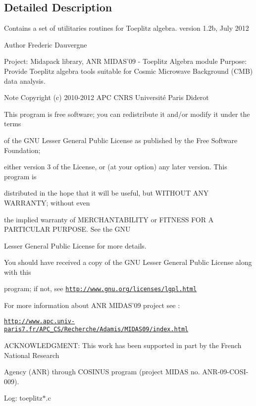 \subsection{Detailed Description}
Contains a set of utilitaries routines for Toeplitz algebra. version 1.\-2b, July 2012 \begin{DoxyAuthor}{Author}
Frederic Dauvergne
\end{DoxyAuthor}
Project\-: Midapack library, A\-N\-R M\-I\-D\-A\-S'09 -\/ Toeplitz Algebra module Purpose\-: Provide Toeplitz algebra tools suitable for Cosmic Microwave Background (C\-M\-B) data analysis.

\begin{DoxyNote}{Note}
Copyright (c) 2010-\/2012 A\-P\-C C\-N\-R\-S Université Paris Diderot 



This program is free software; you can redistribute it and/or modify it under the terms 

of the G\-N\-U Lesser General Public License as published by the Free Software Foundation; 

either version 3 of the License, or (at your option) any later version. This program is 

distributed in the hope that it will be useful, but W\-I\-T\-H\-O\-U\-T A\-N\-Y W\-A\-R\-R\-A\-N\-T\-Y; without even 

the implied warranty of M\-E\-R\-C\-H\-A\-N\-T\-A\-B\-I\-L\-I\-T\-Y or F\-I\-T\-N\-E\-S\-S F\-O\-R A P\-A\-R\-T\-I\-C\-U\-L\-A\-R P\-U\-R\-P\-O\-S\-E. See the G\-N\-U 

Lesser General Public License for more details. 



You should have received a copy of the G\-N\-U Lesser General Public License along with this 

program; if not, see \href{http://www.gnu.org/licenses/lgpl.html}{\tt http\-://www.\-gnu.\-org/licenses/lgpl.\-html} 

For more information about A\-N\-R M\-I\-D\-A\-S'09 project see \-: 

\href{http://www.apc.univ-paris7.fr/APC_CS/Recherche/Adamis/MIDAS09/index.html}{\tt http\-://www.\-apc.\-univ-\/paris7.\-fr/\-A\-P\-C\-\_\-\-C\-S/\-Recherche/\-Adamis/\-M\-I\-D\-A\-S09/index.\-html} 

A\-C\-K\-N\-O\-W\-L\-E\-D\-G\-M\-E\-N\-T\-: This work has been supported in part by the French National Research 

Agency (A\-N\-R) through C\-O\-S\-I\-N\-U\-S program (project M\-I\-D\-A\-S no. A\-N\-R-\/09-\/\-C\-O\-S\-I-\/009).
\end{DoxyNote}
Log\-: toeplitz$\ast$.c

